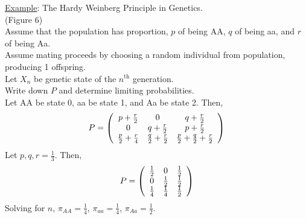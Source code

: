   \noindent\underline{Example}: The Hardy Weinberg Principle in Genetics.\\
  (Figure 6)\\
  Assume that the population has proportion, $p$ of being AA, $q$ of being
  aa, and $r$ of being Aa.\\
  Assume mating proceeds by choosing a random individual from population,
  producing 1 offspring.\\
  Let $X_n$ be genetic state of the $n^{\text{th}}$ generation.\\
  Write down $P$ and determine limiting probabilities.\\
  Let AA be state 0, aa be state 1, and Aa be state 2. Then,
  $$
    P =\left(\begin{array}{c c c}
      p + \frac{r}{2} & 0 & q + \frac{r}{2}\\
      0 & q + \frac{r}{2} & p + \frac{r}{2}\\
      \frac{p}{2} + \frac{r}{4} & \frac{q}{2} + \frac{r}{2} & 
      \frac{p}{2} + \frac{q}{2} + \frac{r}{2}\\
    \end{array}\right)
  $$
  Let $p, q, r = \frac{1}{3}$. Then,
  $$
    P =\left(\begin{array}{c c c}
    \frac{1}{2} & 0 & \frac{1}{2}\\
    0 & \frac{1}{2} & \frac{1}{2} \\
    \frac{1}{4} & \frac{1}{4} & \frac{1}{2}\\
    \end{array}\right)
  $$
  Solving for $n$, $\pi_{AA} = \frac{1}{4}$, $\pi_{aa} = \frac{1}{4}$,
  $\pi_{Aa} = \frac{1}{2}$.\\

